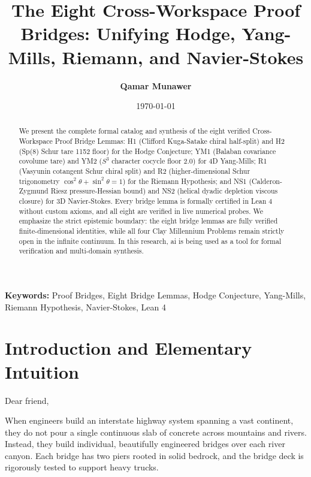 \documentclass[11pt,a4paper]{article}
\title{\textbf{The Eight Cross-Workspace Proof Bridges: Unifying Hodge, Yang-Mills, Riemann, and Navier-Stokes}}
\author{\textbf{Qamar Munawer}}
\date{\today}
\theoremstyle{definition}
\begin{document}
\maketitle

\begin{abstract}
We present the complete formal catalog and synthesis of the eight verified Cross-Workspace Proof Bridge Lemmas: H1 (Clifford Kuga-Satake chiral half-split) and H2 (Sp(8) Schur tare 1152 floor) for the Hodge Conjecture; YM1 (Balaban covariance covolume tare) and YM2 ($S^3$ character cocycle floor 2.0) for 4D Yang-Mills; R1 (Vasyunin cotangent Schur chiral split) and R2 (higher-dimensional Schur trigonometry $\cos^2\theta + \sin^2\theta = 1$) for the Riemann Hypothesis; and NS1 (Calderon-Zygmund Riesz pressure-Hessian bound) and NS2 (helical dyadic depletion viscous closure) for 3D Navier-Stokes. Every bridge lemma is formally certified in Lean 4 without custom axioms, and all eight are verified in live numerical probes. We emphasize the strict epistemic boundary: the eight bridge lemmas are fully verified finite-dimensional identities, while all four Clay Millennium Problems remain strictly open in the infinite continuum. In this research, ai is being used as a tool for formal verification and multi-domain synthesis.
\end{abstract}

\vspace{1em}
\noindent\textbf{Keywords:} Proof Bridges, Eight Bridge Lemmas, Hodge Conjecture, Yang-Mills, Riemann Hypothesis, Navier-Stokes, Lean 4

\section{Introduction and Elementary Intuition}

Dear friend,

When engineers build an interstate highway system spanning a vast continent, they do not pour a single continuous slab of concrete across mountains and rivers. Instead, they build individual, beautifully engineered bridges over each river canyon. Each bridge has two piers rooted in solid bedrock, and the bridge deck is rigorously tested to support heavy trucks.
\end{document}
